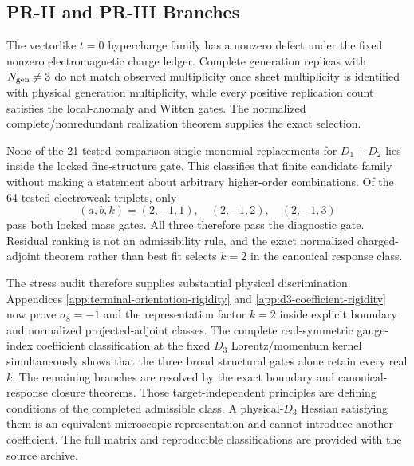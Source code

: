 \subsection{PR-II and PR-III Branches}

The vectorlike $t=0$ hypercharge family has a nonzero defect under the fixed nonzero electromagnetic charge ledger.  Complete generation replicas with $N_{\rm gen}\ne3$ do not match observed multiplicity once sheet multiplicity is identified with physical generation multiplicity, while every positive replication count satisfies the local-anomaly and Witten gates.  The normalized complete/nonredundant realization theorem supplies the exact selection.

None of the 21 tested comparison single-monomial replacements for $D_1+D_2$ lies inside the locked fine-structure gate.  This classifies that finite candidate family without making a statement about arbitrary higher-order combinations.  Of the 64 tested electroweak triplets, only
\begin{equation}
 (a,b,k)=(2,-1,1),\quad(2,-1,2),\quad(2,-1,3)
\end{equation}
pass both locked mass gates.  All three therefore pass the diagnostic gate. Residual ranking is not an admissibility rule, and the exact normalized charged-adjoint theorem rather than best fit selects $k=2$ in the canonical response class.

The stress audit therefore supplies substantial physical discrimination. Appendices
\ref{app:terminal-orientation-rigidity} and \ref{app:d3-coefficient-rigidity} now prove $\sigma_8=-1$ and the representation factor $k=2$ inside explicit boundary and normalized projected-adjoint classes.  The complete real-symmetric gauge-index coefficient classification at the fixed $D_3$ Lorentz/momentum kernel simultaneously shows that the three broad structural gates alone retain every
real $k$.  The remaining branches are resolved by the exact boundary and canonical-response closure theorems.  Those target-independent principles are defining conditions of the completed admissible class.  A physical-$D_3$ Hessian satisfying them is an equivalent microscopic representation and
cannot introduce another coefficient.  The full matrix and reproducible classifications are provided with the source archive.
